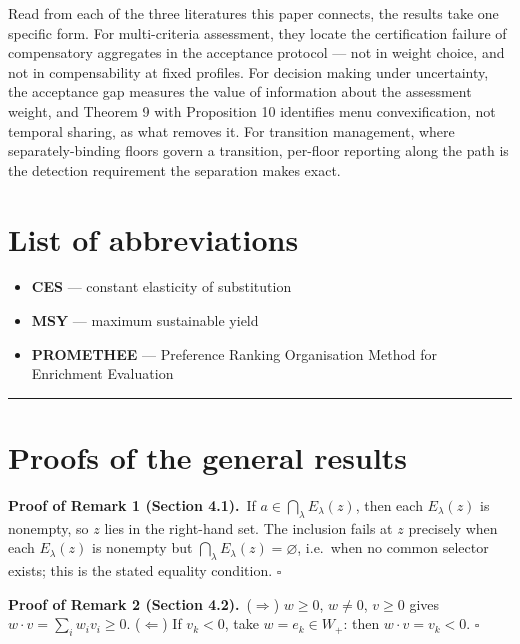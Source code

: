 \documentclass[3p,11pt]{elsarticle}
\begin{document}
Read from each of the three literatures this paper connects, the results
take one specific form. For multi-criteria assessment, they locate the
certification failure of compensatory aggregates in the acceptance
protocol --- not in weight choice, and not in compensability at fixed
profiles. For decision making under uncertainty, the acceptance gap
measures the value of information about the assessment weight, and
Theorem 9 with Proposition 10 identifies menu convexification, not
temporal sharing, as what removes it. For transition management, where
separately-binding floors govern a transition, per-floor reporting along
the path is the detection requirement the separation makes exact.

\section*{List of abbreviations}\label{list-of-abbreviations}

\begin{itemize}
\item \textbf{CES} --- constant elasticity of substitution
\item \textbf{MSY} --- maximum sustainable yield
\item \textbf{PROMETHEE} --- Preference Ranking Organisation Method for Enrichment Evaluation
\end{itemize}

\begin{center}\rule{0.5\linewidth}{0.5pt}\end{center}


\appendix

\section{Proofs of the general results}

\textbf{Proof of Remark 1 (Section 4.1).}\ If \(a \in \bigcap_\lambda E_\lambda(z)\), then each
\(E_\lambda(z)\) is nonempty, so \(z\) lies in the right-hand set. The
inclusion fails at \(z\) precisely when each \(E_\lambda(z)\) is
nonempty but \(\bigcap_\lambda E_\lambda(z) = \varnothing\), i.e.~when
no common selector exists; this is the stated equality condition. \ensuremath{\square}

\textbf{Proof of Remark 2 (Section 4.2).}\ (\(\Rightarrow\)) \(w \ge 0\), \(w \neq 0\), \(v \ge 0\)
gives \(w \cdot v = \sum_i w_i v_i \ge 0\). (\(\Leftarrow\)) If
\(v_k < 0\), take \(w = e_k \in W_+\): then \(w \cdot v = v_k < 0\). \ensuremath{\square}
\end{document}

